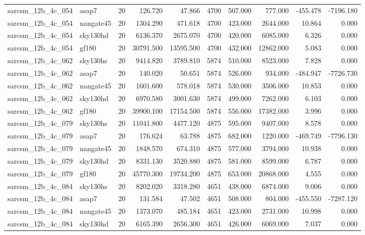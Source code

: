 \begin{longtable}{llrrrrrrrr}
sarcsm\_12b\_4c\_054 & asap7 & 20 & 126.720 & 47.866 & 4700 & 507.000 & 777.000 & -455.478 & -7196.180 \\
sarcsm\_12b\_4c\_054 & nangate45 & 20 & 1304.290 & 471.618 & 4700 & 423.000 & 2644.000 & 10.864 & 0.000 \\
sarcsm\_12b\_4c\_054 & sky130hd & 20 & 6136.370 & 2675.070 & 4700 & 420.000 & 6085.000 & 6.326 & 0.000 \\
sarcsm\_12b\_4c\_054 & gf180 & 20 & 30791.500 & 13595.500 & 4700 & 432.000 & 12862.000 & 5.083 & 0.000 \\
sarcsm\_12b\_4c\_062 & sky130hs & 20 & 9414.820 & 3789.810 & 5874 & 510.000 & 8523.000 & 7.828 & 0.000 \\
sarcsm\_12b\_4c\_062 & asap7 & 20 & 140.020 & 50.651 & 5874 & 526.000 & 934.000 & -484.947 & -7726.730 \\
sarcsm\_12b\_4c\_062 & nangate45 & 20 & 1601.600 & 578.018 & 5874 & 530.000 & 3506.000 & 10.853 & 0.000 \\
sarcsm\_12b\_4c\_062 & sky130hd & 20 & 6970.580 & 3001.630 & 5874 & 499.000 & 7262.000 & 6.103 & 0.000 \\
sarcsm\_12b\_4c\_062 & gf180 & 20 & 39900.100 & 17154.500 & 5874 & 556.000 & 17382.000 & 3.996 & 0.000 \\
sarcsm\_12b\_4c\_079 & sky130hs & 20 & 11041.800 & 4477.120 & 4875 & 595.000 & 9407.000 & 8.578 & 0.000 \\
sarcsm\_12b\_4c\_079 & asap7 & 20 & 176.624 & 63.788 & 4875 & 682.000 & 1220.000 & -469.749 & -7796.130 \\
sarcsm\_12b\_4c\_079 & nangate45 & 20 & 1848.570 & 674.310 & 4875 & 577.000 & 3794.000 & 10.938 & 0.000 \\
sarcsm\_12b\_4c\_079 & sky130hd & 20 & 8331.130 & 3520.880 & 4875 & 581.000 & 8599.000 & 6.787 & 0.000 \\
sarcsm\_12b\_4c\_079 & gf180 & 20 & 45770.300 & 19734.200 & 4875 & 653.000 & 20868.000 & 4.555 & 0.000 \\
sarcsm\_12b\_4c\_084 & sky130hs & 20 & 8202.020 & 3318.280 & 4651 & 438.000 & 6874.000 & 9.006 & 0.000 \\
sarcsm\_12b\_4c\_084 & asap7 & 20 & 131.584 & 47.502 & 4651 & 508.000 & 804.000 & -455.550 & -7287.120 \\
sarcsm\_12b\_4c\_084 & nangate45 & 20 & 1373.070 & 485.184 & 4651 & 423.000 & 2731.000 & 10.998 & 0.000 \\
sarcsm\_12b\_4c\_084 & sky130hd & 20 & 6165.390 & 2656.300 & 4651 & 426.000 & 6069.000 & 7.037 & 0.000 \\

\end{longtable}
